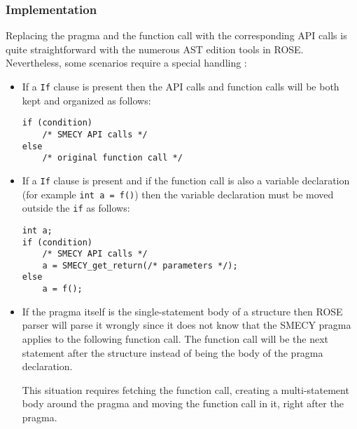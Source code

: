 \documentclass[a4paper]{article}
\begin{document}
	\subsubsection{Implementation} Replacing the pragma and the function call with the corresponding API calls is quite straightforward with the numerous AST edition tools in ROSE. Nevertheless, some scenarios require a special handling :
	\begin{itemize}
		\item If a \verb+If+ clause is present then the API calls and function calls will be both kept and organized as follows:
		\begin{lstlisting}[frame=none, numbers=none]
if (condition)
	/* SMECY API calls */
else
	/* original function call */
		\end{lstlisting}
		\item If a \verb+If+ clause is present and if the function call is also a variable declaration (for example \verb+int a = f()+) then the variable declaration must be moved outside the \verb+if+ as follows:
		\begin{lstlisting}[frame=none, numbers=none]
int a;
if (condition)
	/* SMECY API calls */
	a = SMECY_get_return(/* parameters */);
else
	a = f();
		\end{lstlisting}
		\item If the pragma itself is the single-statement body of a structure then ROSE parser will parse it wrongly since it does not know that the SMECY pragma applies to the following function call. The function call will be the next statement after the structure instead of being the body of the pragma declaration. 
		
		This situation requires fetching the function call, creating a multi-statement body around the pragma and moving the function call in it, right after the pragma.
	\end{itemize}
	
\end{document}
